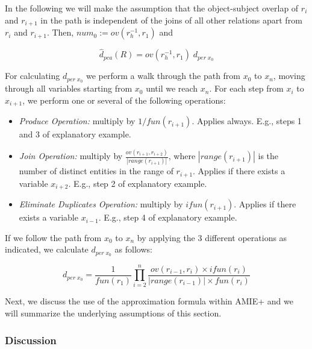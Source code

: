 {{In the following we will make the assumption that the object-subject overlap of $r_{i}$ and $r_{i+1}$ in the path is independent of the joins of all other relations apart from $r_{i}$ and $r_{i+1}$.
Then, $num_0:=ov(r_h^{-1},r_1)$ and

\begin{equation} \label{eq:pcaApproxDenom}
   \widehat{d}_{pca}(R) = ov(r_h^{-1},r_1) \; d_{per\; x_0}
\end{equation}


For calculating $d_{per\; x_0}$ we perform a walk through the path from $x_0$ to $x_n$, moving through all variables starting from $x_0$ until we reach $x_n$.
For each step from $x_i$ to $x_{i+1}$, we perform one or several of the following operations:

\begin{itemize}
 \item \emph{Produce Operation:} multiply by $1/fun(r_{i+1})$. Applies always. E.g., steps 1 and 3 of explanatory example.
 \item \emph{Join Operation:} multiply by $\frac{ov(r_{i+1}, r_{i+2})}{|range(r_{i+1})|}$, where $|range(r_{i+1})|$ is the number of distinct entities in the range of $r_{i+1}$.
Applies if there exists a variable $x_{i+2}$. E.g., step 2   of explanatory example.
 \item \emph{Eliminate Duplicates Operation:} multiply by $ifun(r_{i+1})$. Applies if there exists a variable $x_{i-1}$.  E.g., step 4   of explanatory example.
\end{itemize}

If we follow the path from $x_0$ to $x_n$ by applying  the 3 different operations as indicated, we calculate $d_{per\; x_0}$ as follows:

\begin{equation} \label{eq:pcaApproxDenomPerX0}
 d_{per\; x_0}= \frac{1}{fun(r_1)} \prod_{i=2}^n \frac{ov(r_{i-1},r_i) \times ifun(r_i)}{|range(r_{i-1})| \times fun(r_i)}
\end{equation}

Next, we discuss the use of the approximation formula within AMIE+ and we will summarize the underlying assumptions of this section.

}

\subsubsection{Discussion}

}
